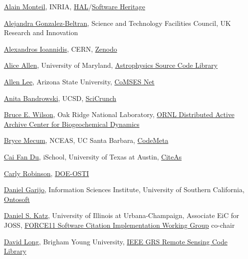 \documentclass[11pt]{article}
\begin{document}
\begin{spacing}{0.86}

\href{https://orcid.org/0000-0003-3150-4837}{Alain Monteil}, INRIA, \href{https://hal.archives-ouvertes.fr/}{HAL}/\href{https://www.softwareheritage.org/}{Software Heritage}

\href{https://orcid.org/0000-0003-3499-8262}{Alejandra Gonzalez-Beltran}, Science and Technology Facilities Council, UK Research and Innovation

\href{https://orcid.org/0000-0002-5082-6404}{Alexandros Ioannidis}, CERN, \href{https://zenodo.org/}{Zenodo}

\href{https://orcid.org/0000-0003-3477-2845}{Alice Allen}, University of Maryland, \href{http://ascl.net/}{Astrophysics Source Code Library}

\href{https://orcid.org/0000-0002-6523-6079}{Allen Lee}, Arizona State University, \href{https://www.comses.net/}{CoMSES Net}

\href{https://orcid.org/0000-0002-5497-0243}{Anita Bandrowski}, UCSD, \href{https://scicrunch.org/}{SciCrunch}

\href{https://orcid.org/0000-0002-1421-1728}{Bruce E. Wilson}, Oak Ridge National Laboratory, \href{https://daac.ornl.gov/}{ORNL Distributed Active Archive Center for Biogeochemical Dynamics}

\href{https://orcid.org/0000-0002-0381-3766}{Bryce Mecum}, NCEAS, UC Santa Barbara, \href{https://codemeta.github.io/}{CodeMeta}

\href{https://orcid.org/0000-0003-2538-607X}{Cai Fan Du}, iSchool, University of Texas at Austin, \href{http://citeas.org/}{CiteAs}

\href{https://orcid.org/0000-0002-8523-1478}{Carly Robinson}, \href{https://www.osti.gov/}{DOE-OSTI}

\href{http://orcid.org/0000-0003-0454-7145}{Daniel Garijo}, Information Sciences Institute, University of Southern
California, \href{http://www.ontosoft.org/}{Ontosoft}

\href{https://orcid.org/0000-0001-5934-7525}{Daniel S. Katz}, University of Illinois at Urbana-Champaign, Associate
EiC for JOSS, \href{https://www.force11.org/group/software-citation-implementation-working-group}{FORCE11 Software Citation Implementation Working Group} co-chair

\href{https://orcid.org/0000-0002-1852-3972}{David Long}, Brigham Young University, \href{https://rscl-grss.org/}{IEEE GRS Remote Sensing Code Library}


\end{spacing}
\end{document}
